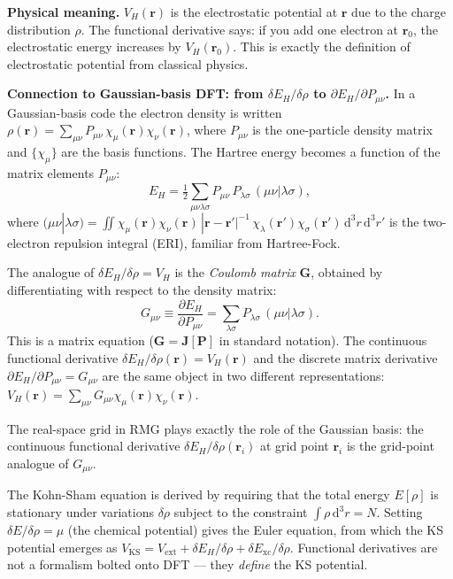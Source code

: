 \documentclass[12pt,letterpaper]{article}
\newcommand{\dd}{\mathrm{d}}
\newcommand{\Exc}{E_{\mathrm{xc}}}
\theoremstyle{definition}
\begin{document}
\noindent\textbf{Physical meaning.}
$V_H(\bm{r})$ is the electrostatic potential at $\bm{r}$ due to the
charge distribution $\rho$. The functional derivative says: if you add
one electron at $\bm{r}_0$, the electrostatic energy increases by $V_H(\bm{r}_0)$.
This is exactly the definition of electrostatic potential from classical
physics.

\begin{insight}
\textbf{Connection to Gaussian-basis DFT: from $\delta E_H/\delta\rho$ to
$\partial E_H/\partial P_{\mu\nu}$.}
In a Gaussian-basis code the electron density is written
$\rho(\bm{r}) = \sum_{\mu\nu}P_{\mu\nu}\,\chi_\mu(\bm{r})\chi_\nu(\bm{r})$,
where $P_{\mu\nu}$ is the one-particle density matrix and $\{\chi_\mu\}$ are
the basis functions.
The Hartree energy becomes a function of the matrix elements $P_{\mu\nu}$:
\begin{equation}
  E_H = \tfrac{1}{2}\sum_{\mu\nu\lambda\sigma}
        P_{\mu\nu}\,P_{\lambda\sigma}\,(\mu\nu|\lambda\sigma),
  \label{eq:hartree_gaussian}
\end{equation}
where $(\mu\nu|\lambda\sigma)=\iint
\chi_\mu(\bm{r})\chi_\nu(\bm{r})\,|\bm{r}-\bm{r}'|^{-1}\,
\chi_\lambda(\bm{r}')\chi_\sigma(\bm{r}')\,\dd^3r\,\dd^3r'$
is the two-electron repulsion integral (ERI), familiar from Hartree-Fock.

The analogue of $\delta E_H/\delta\rho = V_H$ is the \emph{Coulomb matrix}
$\bm{G}$, obtained by differentiating with respect to the density matrix:
\begin{equation}
  G_{\mu\nu} \equiv \frac{\partial E_H}{\partial P_{\mu\nu}}
  = \sum_{\lambda\sigma} P_{\lambda\sigma}\,(\mu\nu|\lambda\sigma).
  \label{eq:G_matrix}
\end{equation}
This is a matrix equation ($\bm{G} = \bm{J}[\bm{P}]$ in standard notation).
The continuous functional derivative $\delta E_H/\delta\rho(\bm{r}) = V_H(\bm{r})$
and the discrete matrix derivative $\partial E_H/\partial P_{\mu\nu} = G_{\mu\nu}$
are the same object in two different representations:
$V_H(\bm{r}) = \sum_{\mu\nu}G_{\mu\nu}\chi_\mu(\bm{r})\chi_\nu(\bm{r})$.

\medskip
\noindent The real-space grid in RMG plays exactly the role of the Gaussian
basis: the continuous functional derivative $\delta E_H/\delta\rho(\bm{r}_i)$
at grid point $\bm{r}_i$ is the grid-point analogue of $G_{\mu\nu}$.
\end{insight}

\begin{insight}
The Kohn-Sham equation is derived by requiring that the total energy
$E[\rho]$ is stationary under variations $\delta\rho$ subject to
the constraint $\int\rho\,\dd^3r = N$.
Setting $\delta E/\delta\rho = \mu$ (the chemical potential) gives
the Euler equation, from which the KS potential emerges as
$V_\text{KS} = V_\text{ext} + \delta E_H/\delta\rho + \delta\Exc/\delta\rho$.
Functional derivatives are not a formalism bolted onto DFT --- they
\emph{define} the KS potential.
\end{insight}
\end{document}
